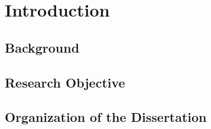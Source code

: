 \chapter{Introduction}

\section{Background}

\section{Research Objective}

\section{Organization of the Dissertation}
